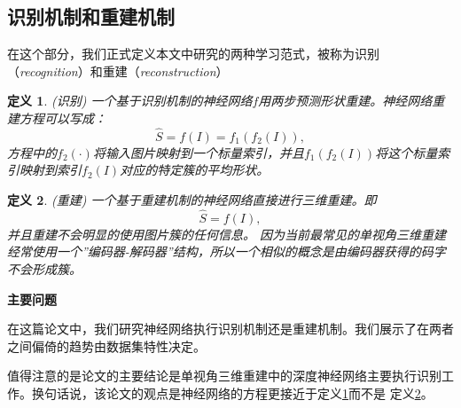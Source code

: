 \documentclass[bachelor, nocolorlinks, printoneside]{seuthesis} %
\newtheorem{theorem}{定义}
\begin{document}
\begin{Main}
\section{识别机制和重建机制}
\label{sec:recog_or_recon}
在这个部分，我们正式定义本文中研究的两种学习范式，被称为识别（\emph{recognition}）和重建（\emph{reconstruction}）

\begin{theorem}\label{def:recognition}(识别)
    一个基于识别机制的神经网络$f$用两步预测形状重建。神经网络重建方程可以写成：
\begin{equation}
        \widehat{S} = f(I) = f_1(f_2(I)),
\end{equation}
方程中的$f_2(\cdot)$将输入图片映射到一个标量索引，并且$f_1(f_2(I))$将这个标量索引映射到索引$f_2(I)$对应的特定簇的平均形状。
\end{theorem}

\begin{theorem}\label{def:reconstruction}(重建)
    一个基于重建机制的神经网络直接进行三维重建。即\begin{equation}
        \widehat{S} = f(I),
    \end{equation}
并且重建不会明显的使用图片簇的任何信息。
因为当前最常见的单视角三维重建经常使用一个”编码器-解码器”结构，所以一个相似的概念是由编码器获得的码字不会形成簇。
\end{theorem}
\textbf{主要问题}

在这篇论文中，我们研究神经网络执行识别机制还是重建机制。我们展示了在两者之间偏倚的趋势由数据集特性决定。

值得注意的是论文\cite{tatarchenko2019single}的主要结论是单视角三维重建中的深度神经网络主要执行识别工作。换句话说，该论文的观点是神经网络的方程更接近于定义\ref{def:recognition}而不是
定义\ref{def:reconstruction}。

\end{Main}
\end{document}
